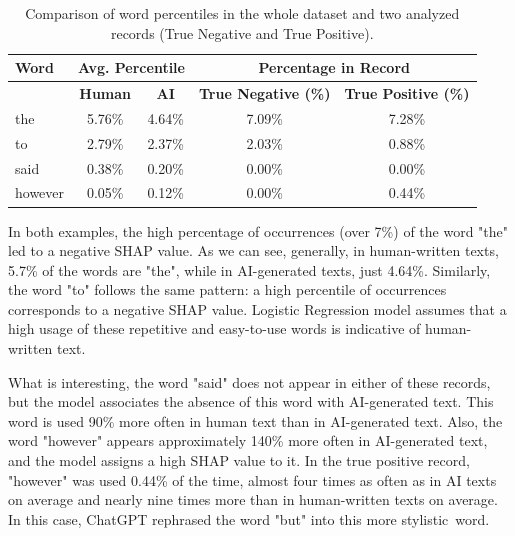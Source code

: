 \vspace{3mm}

\begin{table}[h!]
\centering
\renewcommand{\arraystretch}{1.3} %
\begin{tabular}{|l|c|c|c|c|}
\hline
\textbf{Word} & \multicolumn{2}{c|}{\textbf{Avg. Percentile}} & \multicolumn{2}{c|}{\textbf{Percentage in Record}} \\ \hline
               & \textbf{Human} & \textbf{AI} & \textbf{True Negative (\%)} & \textbf{True Positive (\%)} \\ \hline
the            & 5.76\%         & 4.64\%      & 7.09\%                     & 7.28\%                     \\ 
to             & 2.79\%         & 2.37\%      & 2.03\%                     & 0.88\%                     \\ 
said           & 0.38\%         & 0.20\%      & 0.00\%                     & 0.00\%                     \\ 
however        & 0.05\%         & 0.12\%      & 0.00\%                     & 0.44\%                     \\ \hline
\end{tabular}
\caption{Comparison of word percentiles in the whole dataset and two analyzed records (True Negative and True Positive).}
\label{tab:word_occurrences_percentiles}
\end{table}

\vspace{3mm}

In both examples, the high percentage of occurrences (over 7\%) of the word "the" led to a negative SHAP value. As we can see, generally, in human-written texts, 5.7\% of the words are "the", while in AI-generated texts, just 4.64\%. Similarly, the word "to" follows the same pattern: a high percentile of occurrences corresponds to a negative SHAP value. Logistic Regression model assumes that a high usage of these repetitive and easy-to-use words is indicative of human-written text.

\vspace{3mm}

What is interesting, the word "said" does not appear in either of these records, but the model associates the absence of this word with AI-generated text. This word is used 90\% more often in human text than in AI-generated text. Also, the word "however" appears approximately 140\% more often in AI-generated text, and the model assigns a high SHAP value to it. In the true positive record, "however" was used 0.44\% of the time, almost four times as often as in AI texts on average and nearly nine times more than in human-written texts on average. In this case, ChatGPT rephrased the word "but" into this more stylistic~word.

